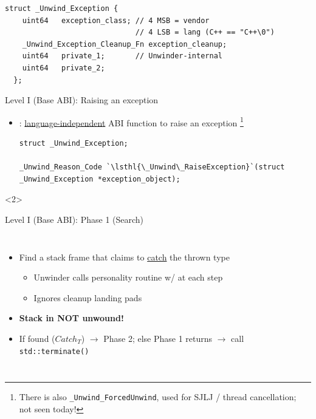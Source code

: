 \newsavebox{\LSTunwindexception}
\begin{lrbox}{\LSTunwindexception}
  \begin{lstlisting}[style=c++,basicstyle={\ttfamily\footnotesize},linewidth=0.8\textwidth]
  struct _Unwind_Exception {
    uint64	 exception_class; // 4 MSB = vendor
                              // 4 LSB = lang (C++ == "C++\0")
    _Unwind_Exception_Cleanup_Fn exception_cleanup;
    uint64	 private_1;       // Unwinder-internal
    uint64	 private_2;
  };
  \end{lstlisting}
\end{lrbox}
\begin{frame}[fragile]{Level I (Base ABI): Raising an exception}
  \begin{itemize}
  \item {}: \underline{language-independent} ABI function to raise an exception%
    \footnote{There is also \texttt{\_Unwind\_ForcedUnwind}, used for SJLJ / thread cancellation; not seen today!}
    \vfill
    \begin{lstlisting}[style=c++,basicstyle={\ttfamily\footnotesize}]
struct _Unwind_Exception;

_Unwind_Reason_Code `\lsthl{\_Unwind\_RaiseException}`(struct _Unwind_Exception *exception_object);
    \end{lstlisting}

  \end{itemize}

  \begin{onlyenv}<2>
  \end{onlyenv}
\end{frame}

\begin{frame}{Level I (Base ABI): Phase 1 (Search)}
  \begin{columns}
    \begin{itemize}
    \item Find a stack frame that claims to \underline{catch} the thrown type
      \begin{itemize}
      \item Unwinder calls personality routine w/  at each step
      \item Ignores cleanup landing pads
      \end{itemize}

    \item \textbf{Stack in NOT unwound!}
    \item If found ($Catch_{T}$) $\rightarrow$ Phase 2; else Phase 1 returns  $\rightarrow$ call \texttt{std::terminate()}
    \end{itemize}

    \begin{center}
      \resizebox{0.9\columnwidth}{!}{}
    \end{center}
  \end{columns}
\end{frame}

